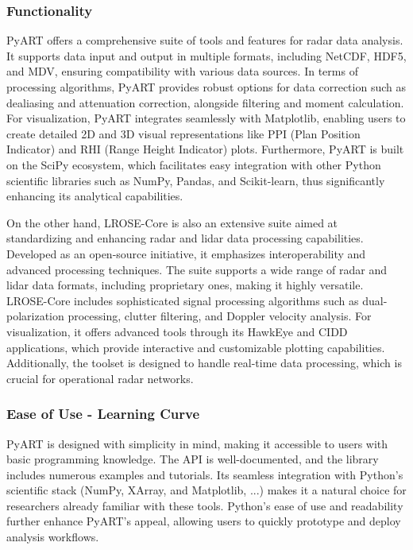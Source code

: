 \subsubsection{Functionality}
PyART offers a comprehensive suite of tools and features for radar data
analysis. It supports data input and output in multiple formats, including
NetCDF, HDF5, and MDV, ensuring compatibility with various data sources. In
terms of processing algorithms, PyART provides robust options for data
correction such as dealiasing and attenuation correction, alongside filtering
and moment calculation. For visualization, PyART integrates seamlessly with
Matplotlib, enabling users to create detailed 2D and 3D visual representations
like PPI (Plan Position Indicator) and RHI (Range Height Indicator) plots.
Furthermore, PyART is built on the SciPy ecosystem, which facilitates easy
integration with other Python scientific libraries such as NumPy, Pandas, and
Scikit-learn, thus significantly enhancing its analytical capabilities.

On the other hand, LROSE-Core is also an extensive suite aimed at standardizing
and enhancing radar and lidar data processing capabilities. Developed as an
open-source initiative, it emphasizes interoperability and advanced processing
techniques. The suite supports a wide range of radar and lidar data formats,
including proprietary ones, making it highly versatile. LROSE-Core includes
sophisticated signal processing algorithms such as dual-polarization processing,
clutter filtering, and Doppler velocity analysis. For visualization, it offers
advanced tools through its HawkEye and CIDD applications, which provide
interactive and customizable plotting capabilities. Additionally, the toolset is
designed to handle real-time data processing, which is crucial for operational
radar networks.

\subsubsection{Ease of Use - Learning Curve}
PyART is designed with simplicity in mind, making it accessible to users with
basic programming knowledge. The API is well-documented, and the library
includes numerous examples and tutorials. Its seamless integration with Python's
scientific stack (NumPy, XArray, and Matplotlib, ...) makes it a natural choice
for researchers already familiar with these tools. Python's ease of use and
readability further enhance PyART's appeal, allowing users to quickly prototype
and deploy analysis workflows.

